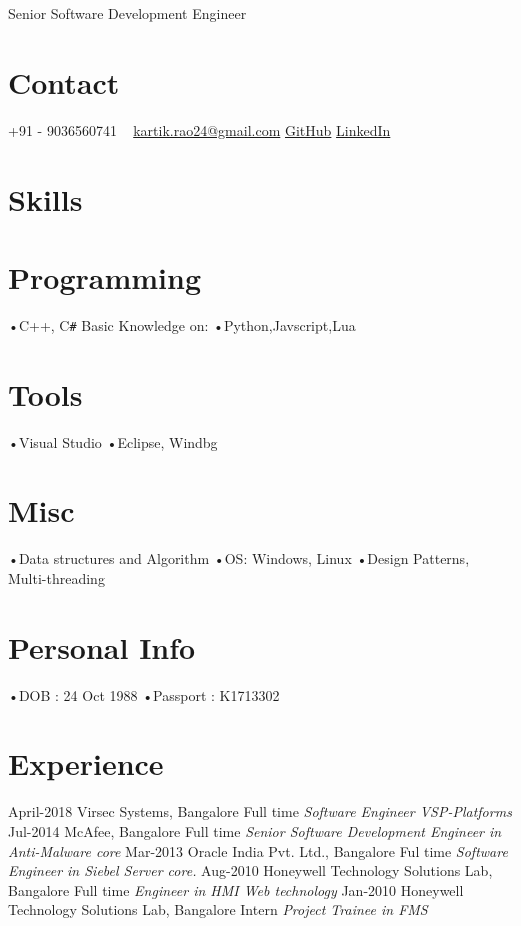 \documentclass[]{kartikkumar-cv}
\begin{document}
       {Senior Software Development Engineer}
          
\begin{aside}
  \section{Contact}
    +91 - 9036560741
    ~
    \href{mailto:kartik.rao24@gmail.com}{kartik.rao24@gmail.com}
    \href{https://github.com/raokartikkumar24}{GitHub}
    \href{https://in.linkedin.com/in/raokartikkumar}{LinkedIn}
    ~
  \section{Skills}
  \section{Programming}
   •C++, C\texttt{\#}
   Basic Knowledge on:
   •Python,Javscript,Lua
    ~
    \section{Tools}
    •Visual Studio
    •Eclipse, Windbg
    \section{Misc}
   •Data structures and Algorithm
   •OS: Windows, Linux
   •Design Patterns, Multi-threading
   ~
   \section{Personal Info}
   •DOB : 24 Oct 1988
   •Passport : K1713302
   ~
\end{aside}

\section{Experience}

\begin{entrylist}
	\entry
	{April-2018}
	{Virsec Systems, Bangalore}
	{Full time}
	{\emph{Software Engineer VSP-Platforms}}
  \entry
    {Jul-2014}
    {McAfee, Bangalore}
    {Full time}
    {\emph{Senior Software Development Engineer in Anti-Malware core}}
  \entry
    {Mar-2013}
    {Oracle India Pvt. Ltd., Bangalore}
    {Ful time}
    {\emph{Software Engineer in Siebel Server core.}}
  \entry
    {Aug-2010}
    {Honeywell Technology Solutions Lab, Bangalore}
    {Full time}
    {\emph{Engineer in HMI Web technology}}
   \entry
   {Jan-2010}
   {Honeywell Technology Solutions Lab, Bangalore}
   {Intern}
   {\emph{Project Trainee in FMS} }
\end{entrylist}
\end{document}
